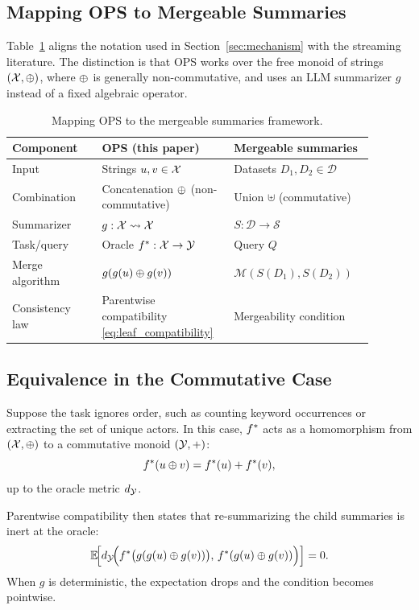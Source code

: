 \subsection{Mapping OPS to Mergeable Summaries}

Table~\ref{tab:mergeable_mapping} aligns the notation used in Section~\ref{sec:mechanism} with the streaming literature. The distinction is that OPS works over the free monoid of strings $(\mathcal{X},\oplus)$, where $\oplus$ is generally non-commutative, and uses an LLM summarizer $g$ instead of a fixed algebraic operator.

\begin{table}[t]
    \centering
    \begin{tabular}{p{0.23\linewidth}p{0.33\linewidth}p{0.33\linewidth}}
        \toprule
        \textbf{Component} & \textbf{OPS (this paper)} & \textbf{Mergeable summaries} \\
        \midrule
        Input & Strings $u,v\in\mathcal{X}$ & Datasets $D_1,D_2\in\mathcal{D}$ \\
        Combination & Concatenation $\oplus$ (non-commutative) & Union $\uplus$ (commutative) \\
        Summarizer & $g:\mathcal{X}\rightsquigarrow\mathcal{X}$ & $S:\mathcal{D}\to\mathcal{S}$ \\
        Task/query & Oracle $f^{\ast}:\mathcal{X}\to\mathcal{Y}$ & Query $Q$ \\
        Merge algorithm & $g(g(u)\oplus g(v))$ & $\mathcal{M}(S(D_1),S(D_2))$ \\
        Consistency law & Parentwise compatibility \eqref{eq:leaf_compatibility} & Mergeability condition \\
        \bottomrule
    \end{tabular}
    \caption{Mapping OPS to the mergeable summaries framework.}
    \label{tab:mergeable_mapping}
\end{table}

\subsection{Equivalence in the Commutative Case}

Suppose the task ignores order, such as counting keyword occurrences or extracting the set of unique actors. In this case, $f^{\ast}$ acts as a homomorphism from $(\mathcal{X},\oplus)$ to a commutative monoid $(\mathcal{Y},+)$:
\[
    f^{\ast}(u\oplus v) = f^{\ast}(u) + f^{\ast}(v),
\]
up to the oracle metric $d_{\mathcal{Y}}$.

Parentwise compatibility then states that re-summarizing the child summaries is inert at the oracle:
\[
    \mathbb{E}\!\Big[d_{\mathcal{Y}}\!\Big(f^{\ast}\big(g(g(u)\oplus g(v))\big),\, f^{\ast}(g(u)\oplus g(v))\Big)\Big]=0.
\]
When $g$ is deterministic, the expectation drops and the condition becomes pointwise.

